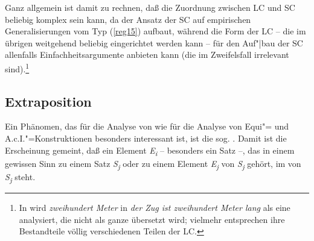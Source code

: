 \documentclass[output=paper]{langsci/langscibook}
\begin{document}
Ganz allgemein ist damit zu rechnen, daß die Zuordnung zwischen LC und SC beliebig komplex sein
kann, da der Ansatz der SC auf empirischen Generalisierungen vom Typ (\ref{reg15}) aufbaut, während
die Form der LC -- die im übrigen weitgehend beliebig eingerichtet werden kann -- für den Auf"|bau der
SC allenfalls Einfachheitsargumente anbieten kann (die im Zweifelsfall irrelevant sind).\footnote{%
	In
  \citet[158--160]{Eisenberg76} wird \zb \textit{zweihundert Meter} in \textit{der Zug ist
    zweihundert Meter lang} als eine  analysiert, die nicht als ganze übersetzt wird;
  vielmehr entsprechen ihre Bestandteile völlig verschiedenen Teilen der LC.%
}

\subsection{Extraposition}%
\label{subsec:2-1-2}

Ein Phänomen, das für die Analyse von  wie für die Analyse von Equi"= und A.c.I."=Konstruktionen besonders interessant ist, ist die sog. . Damit ist die Erscheinung gemeint, daß ein Element \textit{E\textsubscript{i}} -- besonders ein Satz --, das in einem gewissen Sinn zu einem Satz \textit{S\textsubscript{j}} oder zu einem Element \textit{E\textsubscript{j}} von \textit{S\textsubscript{j}} gehört, im  von \textit{S\textsubscript{j}} steht.
\end{document}
